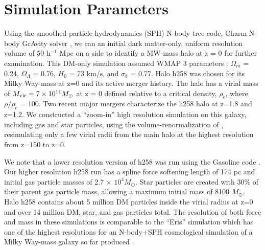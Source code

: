 \documentclass[]{emulateapj}
\begin{document}



\section{Simulation Parameters}\label{sec-model}

Using the smoothed particle hydrodynamics (SPH) N-body tree code, Charm N-body GrAvity solver \citep[ChaNGa;][]{Menon2015}, we ran an initial dark matter-only, uniform resolution volume of 50 h$^{-1}$ Mpc on a side to identify a MW-mass halo at z = 0 for further examination. This DM-only simulation assumed WMAP 3 parameters \citep{Spergel2007}: $\Omega_m$ = 0.24, $\Omega_{\Lambda}$ = 0.76, $H_0$ = 73 km/s, and $\sigma _8$ = 0.77. Halo h258 was chosen for its Milky Way-mass at z=0 and its active merger history. The halo has a virial mass of $M_{\rm vir} = 7 \times 10^{11} M_{\odot}$ at z = 0 defined relative to a critical density, $\rho_c$, where $\rho / \rho_c$ = 100. Two recent major mergers characterize the h258 halo at z=1.8 and z=1.2. We constructed a ``zoom-in'' high resolution simulation on this galaxy, including gas and star particles, using the volume-renormalization of \cite{Katz1993}, resimulating only a few virial radii from the main halo at the highest resolution from z=150 to z=0.  

We note that a lower resolution version of h258 was run using the Gasoline code \citep{Wadsley2004}. Our higher resolution h258 run has a spline force softening length of 174 pc and initial gas particle masses of 2.7 $\times$ $10^4 M_{\odot}$. Star particles are created with 30$\%$ of their parent gas particle mass, allowing a maximum initial mass of 8100 $M_{\odot}$. Halo h258 contains about 5 million DM particles inside the virial radius at z=0 and over 14 million DM, star, and gas particles total. The resolution of both force and mass in these simulations is comparable to the ``Eris'' simulation which has one of the highest resolutions for an N-body+SPH cosmological simulation of a Milky Way-mass galaxy so far produced \citep{Guedes2011}.  
\end{document}
